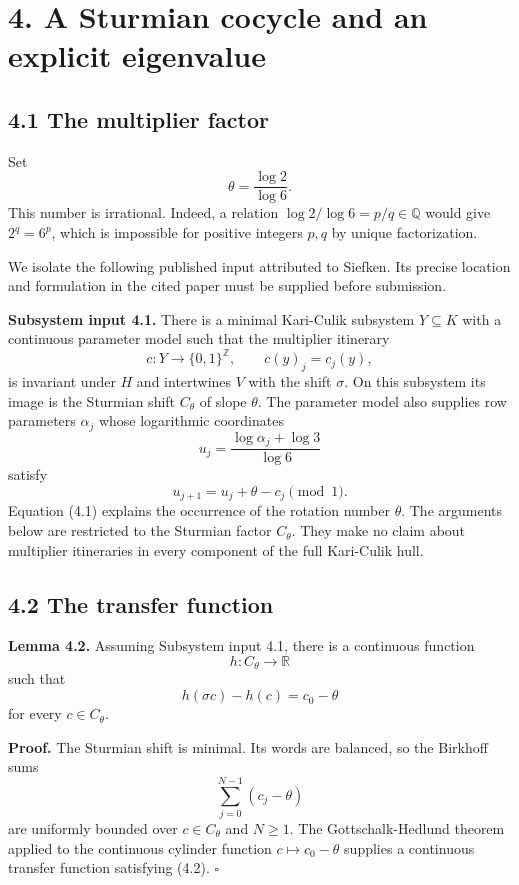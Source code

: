 \documentclass[11pt]{article}
\begin{document}
\section*{4. A Sturmian cocycle and an explicit eigenvalue}

\subsection*{4.1 The multiplier factor}

Set
\[
  \theta=\frac{\log2}{\log6}.
\]
This number is irrational. Indeed, a relation
\(\log2/\log6=p/q\in\mathbb Q\) would give \(2^q=6^p\), which is impossible
for positive integers \(p,q\) by unique factorization.

We isolate the following published input attributed to Siefken. Its precise
location and formulation in the cited paper must be supplied before
submission.

\textbf{Subsystem input 4.1.} There is a minimal Kari-Culik subsystem
\(Y\subseteq K\) with a continuous parameter model such that the multiplier
itinerary
\[
  c:Y\longrightarrow\{0,1\}^{\mathbb Z},
  \qquad
  c(y)_j=c_j(y),
\]
is invariant under \(H\) and intertwines \(V\) with the shift \(\sigma\).
On this subsystem its image is the Sturmian shift \(C_\theta\) of slope
\(\theta\). The parameter model also supplies row parameters \(\alpha_j\)
whose logarithmic coordinates
\[
  u_j=\frac{\log\alpha_j+\log3}{\log6}
\]
satisfy
\[
  u_{j+1}=u_j+\theta-c_j\pmod1.
  \tag{4.1}
\]
Equation (4.1) explains the occurrence of the rotation number \(\theta\).
The arguments below are restricted to the Sturmian factor \(C_\theta\).
They make no claim about multiplier itineraries in every component of the
full Kari-Culik hull.

\subsection*{4.2 The transfer function}

\textbf{Lemma 4.2.} Assuming Subsystem input 4.1, there is a continuous function
\[
  h:C_\theta\longrightarrow\mathbb R
\]
such that
\[
  h(\sigma c)-h(c)=c_0-\theta
  \tag{4.2}
\]
for every \(c\in C_\theta\).

\textbf{Proof.} The Sturmian shift is minimal. Its words are balanced, so the
Birkhoff sums
\[
  \sum_{j=0}^{N-1}(c_j-\theta)
\]
are uniformly bounded over \(c\in C_\theta\) and \(N\geq1\). The
Gottschalk-Hedlund theorem applied to the continuous cylinder function
\(c\mapsto c_0-\theta\) supplies a continuous transfer function satisfying
(4.2). \(\square\)
\end{document}
